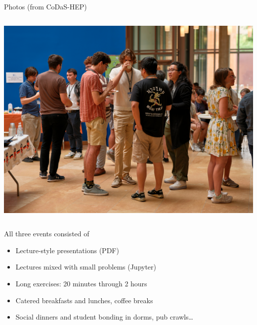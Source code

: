 \documentclass[aspectratio=169]{beamer}
\begin{document}
\begin{frame}{Photos (from CoDaS-HEP)}
\begin{columns}
\includegraphics[width=\linewidth]{PHOTOS/DSCF2642.jpg}
\end{columns}
\end{frame}

\begin{frame}{All three events consisted of}
\Large
\vspace{0.5 cm}
\begin{itemize}\setlength{\itemsep}{0.25 cm}
\item<1-> Lecture-style presentations (PDF)
\item<2-> Lectures mixed with small problems (Jupyter)
\item<3-> Long exercises: 20 minutes through 2 hours
\item<4-> Catered breakfasts and lunches, coffee breaks
\item<5-> Social dinners and student bonding in dorms, pub crawls\ldots
\end{itemize}

\vspace{0.5 cm}
\large
{}

\vspace{0.25 cm}
\end{frame}
\end{document}
